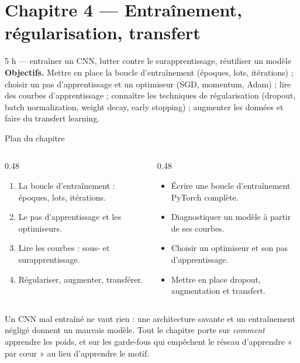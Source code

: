 \section{Chapitre 4 --- Entraînement, régularisation, transfert}

%
{5 h --- entraîner un CNN, lutter contre le surapprentissage, réutiliser un modèle}%
{\textbf{Objectifs.} Mettre en place la boucle d'entraînement (époques, lots,
itérations) ; choisir un pas d'apprentissage et un optimiseur (SGD, momentum, Adam) ;
lire des courbes d'apprentissage ; connaître les techniques de régularisation
(dropout, batch normalization, weight decay, early stopping) ; augmenter les
données et faire du transfert learning.}

\begin{frame}{Plan du chapitre}
\begin{columns}[t]
\begin{column}{0.48\textwidth}
\begin{kbox}
\begin{enumerate}
  \item La boucle d'entraînement : époques, lots, itérations.
  \item Le pas d'apprentissage et les optimiseurs.
  \item Lire les courbes : sous- et surapprentissage.
  \item Régulariser, augmenter, transférer.
\end{enumerate}
\end{kbox}
\end{column}
\begin{column}{0.48\textwidth}
\begin{ebox}
\begin{itemize}
  \item Écrire une boucle d'entraînement PyTorch complète.
  \item Diagnostiquer un modèle à partir de ses courbes.
  \item Choisir un optimiseur et son pas d'apprentissage.
  \item Mettre en place dropout, augmentation et transfert.
\end{itemize}
\end{ebox}
\end{column}
\end{columns}
\vspace{1mm}
\begin{wbox}
Un CNN mal entraîné ne vaut rien : une architecture savante et un entraînement
négligé donnent un mauvais modèle. Tout le chapitre porte sur \emph{comment}
apprendre les poids, et sur les garde-fous qui empêchent le réseau d'apprendre
« par cœur » au lieu d'apprendre le motif.
\end{wbox}
\end{frame}

